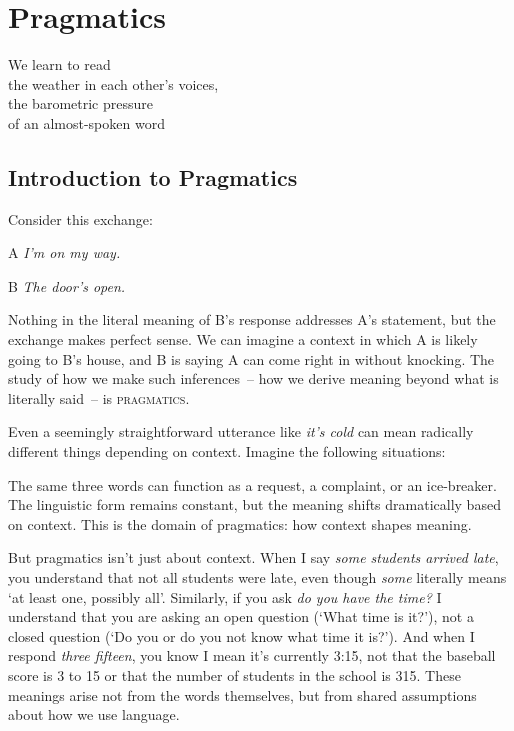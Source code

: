 \chapter{Pragmatics} \label{ch:pragmatics}

\epigraph{We learn to read\\
the weather in each other's voices,\\
the barometric pressure\\
of an almost-spoken word}{}

\section{Introduction to Pragmatics}

Consider this exchange:

\begin{dialogue}
\item[A] \textit{I'm on my way.}
\item[B] \textit{The door's open.}
\end{dialogue}

Nothing in the literal meaning of B's response addresses A's statement, but the exchange makes perfect sense. We can imagine a context in which A is likely going to B's house, and B is saying A can come right in without knocking. The study of how we make such inferences~-- how we derive meaning beyond what is literally said~-- is \textsc{pragmatics}.

Even a seemingly straightforward utterance like \textit{it's cold} can mean radically different things depending on context. Imagine the following situations:

\ea
    \z
\z

The same three words can function as a request, a complaint, or an ice-breaker. The linguistic form remains constant, but the meaning shifts dramatically based on context. This is the domain of pragmatics: how context shapes meaning.

But pragmatics isn't just about context. When I say \textit{some students arrived late}, you understand that not all students were late, even though \textit{some} literally means `at least one, possibly all'. Similarly, if you ask \textit{do you have the time?} I understand that you are asking an open question (`What time is it?'), not a closed question (`Do you or do you not know what time it is?'). And when I respond \textit{three fifteen}, you know I mean it's currently 3:15, not that the baseball score is 3 to 15 or that the number of students in the school is 315. These meanings arise not from the words themselves, but from shared assumptions about how we use language.

